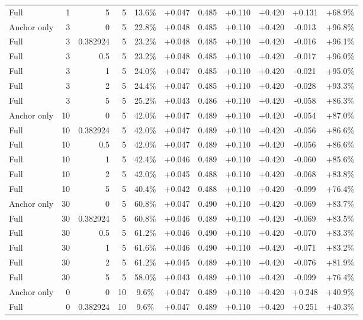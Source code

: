 \begin{table}[htbp]
\begin{tabular}{lrrrccccccc}
Full & 1 & 5 & 5 & 13.6\% & +0.047 & 0.485 & +0.110 & +0.420 & +0.131 & +68.9\% \\
Anchor only & 3 & 0 & 5 & 22.8\% & +0.048 & 0.485 & +0.110 & +0.420 & -0.013 & +96.8\% \\
Full & 3 & 0.382924 & 5 & 23.2\% & +0.048 & 0.485 & +0.110 & +0.420 & -0.016 & +96.1\% \\
Full & 3 & 0.5 & 5 & 23.2\% & +0.048 & 0.485 & +0.110 & +0.420 & -0.017 & +96.0\% \\
Full & 3 & 1 & 5 & 24.0\% & +0.047 & 0.485 & +0.110 & +0.420 & -0.021 & +95.0\% \\
Full & 3 & 2 & 5 & 24.4\% & +0.047 & 0.485 & +0.110 & +0.420 & -0.028 & +93.3\% \\
Full & 3 & 5 & 5 & 25.2\% & +0.043 & 0.486 & +0.110 & +0.420 & -0.058 & +86.3\% \\
Anchor only & 10 & 0 & 5 & 42.0\% & +0.047 & 0.489 & +0.110 & +0.420 & -0.054 & +87.0\% \\
Full & 10 & 0.382924 & 5 & 42.0\% & +0.047 & 0.489 & +0.110 & +0.420 & -0.056 & +86.6\% \\
Full & 10 & 0.5 & 5 & 42.0\% & +0.047 & 0.489 & +0.110 & +0.420 & -0.056 & +86.6\% \\
Full & 10 & 1 & 5 & 42.4\% & +0.046 & 0.489 & +0.110 & +0.420 & -0.060 & +85.6\% \\
Full & 10 & 2 & 5 & 42.0\% & +0.045 & 0.488 & +0.110 & +0.420 & -0.068 & +83.8\% \\
Full & 10 & 5 & 5 & 40.4\% & +0.042 & 0.488 & +0.110 & +0.420 & -0.099 & +76.4\% \\
Anchor only & 30 & 0 & 5 & 60.8\% & +0.047 & 0.490 & +0.110 & +0.420 & -0.069 & +83.7\% \\
Full & 30 & 0.382924 & 5 & 60.8\% & +0.046 & 0.489 & +0.110 & +0.420 & -0.069 & +83.5\% \\
Full & 30 & 0.5 & 5 & 61.2\% & +0.046 & 0.490 & +0.110 & +0.420 & -0.070 & +83.3\% \\
Full & 30 & 1 & 5 & 61.6\% & +0.046 & 0.490 & +0.110 & +0.420 & -0.071 & +83.2\% \\
Full & 30 & 2 & 5 & 61.2\% & +0.045 & 0.489 & +0.110 & +0.420 & -0.076 & +81.9\% \\
Full & 30 & 5 & 5 & 58.0\% & +0.043 & 0.489 & +0.110 & +0.420 & -0.099 & +76.4\% \\
Anchor only & 0 & 0 & 10 & 9.6\% & +0.047 & 0.489 & +0.110 & +0.420 & +0.248 & +40.9\% \\
Full & 0 & 0.382924 & 10 & 9.6\% & +0.047 & 0.489 & +0.110 & +0.420 & +0.251 & +40.3\% \\

\end{tabular}
\end{table}
